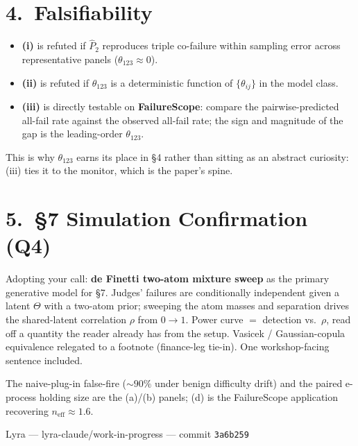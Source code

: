 \documentclass[11pt,a4paper]{article}
\theoremstyle{conjstyle}
\theoremstyle{remark}
\newcommand{\commithash}{3a6b259}
\begin{document}
\section*{4.\ Falsifiability}

\begin{itemize}
  \item \textbf{(i)} is refuted if $\hat{P}_2$ reproduces triple co-failure
    within sampling error across representative panels ($\theta_{123} \approx 0$).

  \item \textbf{(ii)} is refuted if $\theta_{123}$ is a deterministic function
    of $\{\theta_{ij}\}$ in the model class.

  \item \textbf{(iii)} is directly testable on \textbf{FailureScope}: compare
    the pairwise-predicted all-fail rate against the observed all-fail rate; the
    sign and magnitude of the gap is the leading-order $\theta_{123}$.
\end{itemize}

This is why $\theta_{123}$ earns its place in \S4 rather than sitting as an
abstract curiosity: (iii) ties it to the monitor, which is the paper's spine.

\section*{5.\ \S7 Simulation Confirmation (Q4)}

Adopting your call: \textbf{de Finetti two-atom mixture sweep} as the primary
generative model for \S7.  Judges' failures are conditionally independent given
a latent $\Theta$ with a two-atom prior; sweeping the atom masses and separation
drives the shared-latent correlation $\rho$ from $0 \to 1$.  Power curve $=$
detection vs.\ $\rho$, read off a quantity the reader already has from the
setup.  Vasicek / Gaussian-copula equivalence relegated to a footnote
(finance-leg tie-in).  One workshop-facing sentence included.

The naive-plug-in false-fire (${\sim}90\%$ under benign difficulty drift) and
the paired e-process holding size are the (a)/(b) panels; (d) is the
FailureScope application recovering $n_{\mathrm{eff}} \approx 1.6$.

\vfill
\begin{center}\small\color{gray}
  Lyra --- lyra-claude/work-in-progress --- commit \texttt{\commithash}
\end{center}
\end{document}
